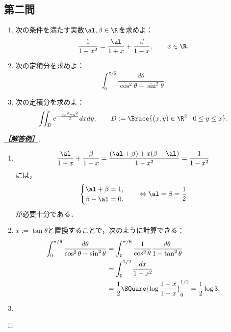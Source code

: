 \documentclass[uplatex,dvipdfmx]{jsarticle}
\begin{document}
\subsection{第二問}

\begin{tcolorbox}[colframe=ForestGreen, colback=ForestGreen!10!white,breakable,colbacktitle=ForestGreen!40!white,coltitle=black,fonttitle=\bfseries\sffamily,
    title=第２問]
    \begin{problem}\mbox{}
        \begin{enumerate}[{問}1]
            \item 次の条件を満たす実数$\al,\beta\in\R$を求めよ：
            \[\frac{1}{1-x^2}=\frac{\al}{1+x}+\frac{\beta}{1-x},\qquad x\in\R.\]
            \item 次の定積分を求めよ：
            \[\int^{\pi/6}_0\frac{d\theta}{\cos^2\theta-\sin^2\theta}.\]
            \item 次の定積分を求めよ：
            \[\iint_De^{-\frac{3x^2-y^2}{2}}dxdy,\qquad D:=\Brace{(x,y)\in\R^2\mid0\le y\le x}.\]
        \end{enumerate}
    \end{problem}
\end{tcolorbox}
\begin{proof}[\textbf{\underline{［解答例］}}]\mbox{}
    \begin{enumerate}
        \item \[\frac{\al}{1+x}+\frac{\beta}{1-x}=\frac{(\al+\beta)+x(\beta-\al)}{1-x^2}=\frac{1}{1-x^2}\]
        には，
        \[\begin{cases}
            \al+\beta=1,\\
            \beta-\al=0.
        \end{cases}\quad\Leftrightarrow\al=\beta=\frac{1}{2}\]
        が必要十分である．
        \item $x:=\tan\theta$と置換することで，次のように計算できる：
        \begin{align*}
            \int^{\pi/6}_0\frac{d\theta}{\cos^2\theta-\sin^2\theta}&=\int^{\pi/6}_0\frac{1}{\cos^2\theta}\frac{d\theta}{1-\tan^2\theta}\\
            &=\int^{1/2}_0\frac{dx}{1-x^2}\\
            &=\frac{1}{2}\SQuare{\log\frac{1+x}{1-x}}^{1/2}_0=\frac{1}{2}\log3.
        \end{align*}
        \item 
    \end{enumerate}
\end{proof}
\end{document}
